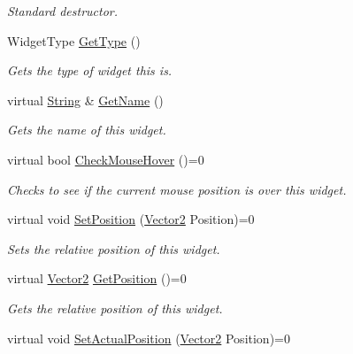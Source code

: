 \begin{DoxyCompactItemize}
\begin{DoxyCompactList}\small\item\em Standard destructor. \item\end{DoxyCompactList}\item 
WidgetType \hyperlink{classphys_1_1UI_1_1Widget_a3aba1def8a818fe71cd2209a4350468c}{GetType} ()
\begin{DoxyCompactList}\small\item\em Gets the type of widget this is. \item\end{DoxyCompactList}\item 
virtual \hyperlink{namespacephys_aa03900411993de7fbfec4789bc1d392e}{String} \& \hyperlink{classphys_1_1UI_1_1Widget_a35d6e7ce60a9b295d8659345627cf7e0}{GetName} ()
\begin{DoxyCompactList}\small\item\em Gets the name of this widget. \item\end{DoxyCompactList}\item 
virtual bool \hyperlink{classphys_1_1UI_1_1Widget_a613df6dbb42efe139d185043a00259dc}{CheckMouseHover} ()=0
\begin{DoxyCompactList}\small\item\em Checks to see if the current mouse position is over this widget. \item\end{DoxyCompactList}\item 
virtual void \hyperlink{classphys_1_1UI_1_1Widget_aae1c0b891125823e7ade8cbc7e4ba6b6}{SetPosition} (\hyperlink{classphys_1_1Vector2}{Vector2} Position)=0
\begin{DoxyCompactList}\small\item\em Sets the relative position of this widget. \item\end{DoxyCompactList}\item 
virtual \hyperlink{classphys_1_1Vector2}{Vector2} \hyperlink{classphys_1_1UI_1_1Widget_a3e464b028b0d1b5755923b8790260c33}{GetPosition} ()=0
\begin{DoxyCompactList}\small\item\em Gets the relative position of this widget. \item\end{DoxyCompactList}\item 
virtual void \hyperlink{classphys_1_1UI_1_1Widget_ac8f70c390e7724e57fc99e51d8004a9b}{SetActualPosition} (\hyperlink{classphys_1_1Vector2}{Vector2} Position)=0

\end{DoxyCompactItemize}
